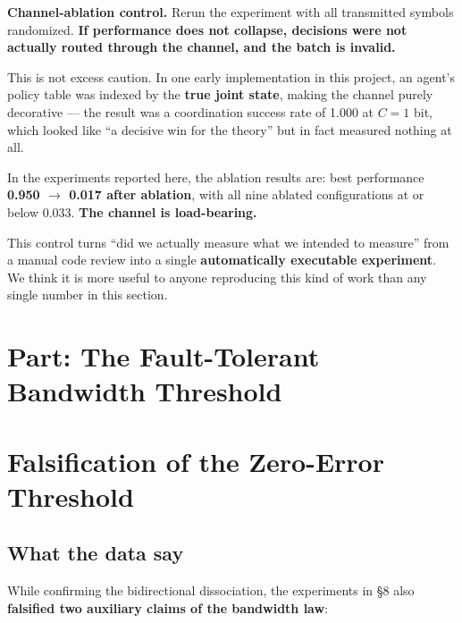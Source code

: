 \documentclass[11pt]{article}
\renewenvironment{quote}
  {\def\FrameCommand{{\color{gray!60}\vrule width 2pt}\hspace{8pt}}%
   \MakeFramed{\advance\hsize-\width \FrameRestore}\begin{itshape}}
  {\end{itshape}\endMakeFramed}
\begin{document}
\begin{quote}
\textbf{Channel-ablation control.} Rerun the experiment with all transmitted symbols randomized. \textbf{If performance does not collapse, decisions were not actually routed through the channel, and the batch is invalid.}
\end{quote}

This is not excess caution. In one early implementation in this project, an agent's policy table was indexed by the \textbf{true joint state}, making the channel purely decorative --- the result was a coordination success rate of 1.000 at \(C=1\) bit, which looked like ``a decisive win for the theory'' but in fact measured nothing at all.

In the experiments reported here, the ablation results are: best performance \textbf{0.950 \(\rightarrow\) 0.017 after ablation}, with all nine ablated configurations at or below 0.033. \textbf{The channel is load-bearing.}

\begin{quote}
This control turns ``did we actually measure what we intended to measure'' from a manual code review into a single \textbf{automatically executable experiment}. We think it is more useful to anyone reproducing this kind of work than any single number in this section.
\end{quote}

\hypertarget{part-the-fault-tolerant-bandwidth-threshold}{%
\section*{Part: The Fault-Tolerant Bandwidth Threshold}\label{part-the-fault-tolerant-bandwidth-threshold}}

\hypertarget{falsification-of-the-zero-error-threshold}{%
\section{Falsification of the Zero-Error Threshold}\label{falsification-of-the-zero-error-threshold}}

\hypertarget{what-the-data-say}{%
\subsection{What the data say}\label{what-the-data-say}}

While confirming the bidirectional dissociation, the experiments in \S{}8 also \textbf{falsified two auxiliary claims of the bandwidth law}:
\end{document}
